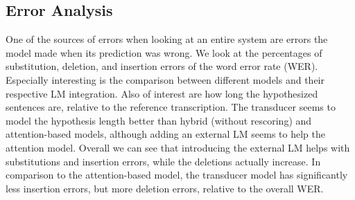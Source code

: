 \documentclass[a4paper]{article}
\begin{document}
\subsection{Error Analysis}

One of the sources of errors when looking at an entire system
are errors the model made when its prediction was wrong.
We look at the percentages of substitution, deletion, and insertion errors of the word error rate (WER).
Especially interesting is the comparison between different models and their respective LM integration.
Also of interest are how long the hypothesized sentences are, relative to the reference transcription.
The transducer seems to model the hypothesis length better than hybrid (without rescoring) and attention-based models, although adding an external LM seems to help the attention model.
Overall we can see that introducing the external LM helps with substitutions and insertion errors,
while the deletions actually increase.
In comparison to the attention-based model,
the transducer model has significantly less insertion errors,
but more deletion errors, relative to the overall WER.
\end{document}
